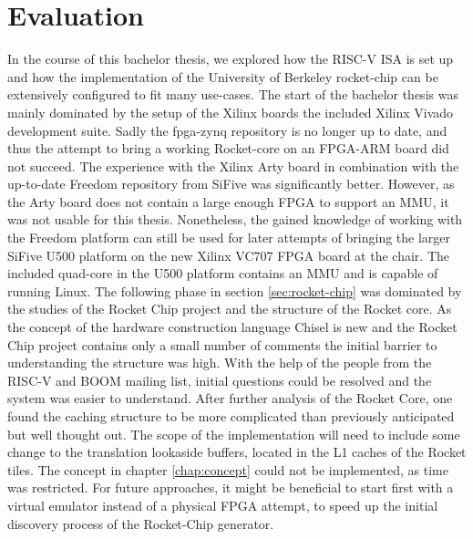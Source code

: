 \chapter{Evaluation}\label{chap:evaluation}
In the course of this bachelor thesis, we explored how the
RISC-V ISA is set up and how the implementation of the
University of Berkeley rocket-chip can be extensively
configured to fit many use-cases.
The start of the bachelor thesis was mainly dominated
by the setup of the Xilinx boards the included Xilinx Vivado
development suite.
Sadly the fpga-zynq repository is no longer up to date, and thus
the attempt to bring a working Rocket-core on an FPGA-ARM board did
not succeed.
The experience with the Xilinx Arty board in combination
with the up-to-date Freedom repository from SiFive was significantly better.
However, as the Arty board does not contain a large enough
FPGA to support an MMU, it was not usable for this thesis.
Nonetheless, the gained knowledge of working with the Freedom
platform can still be used for later attempts of bringing
the larger SiFive U500 platform on the new Xilinx VC707 FPGA board
at the chair. The included quad-core in the U500 platform
contains an MMU and is capable of running Linux.
The following phase in
section \ref{sec:rocket-chip} was dominated by the studies of
the Rocket Chip project and the structure of the Rocket core.
As the concept of the hardware construction language Chisel
is new and the Rocket Chip project contains only a small number
of comments the initial barrier to understanding the structure was high.
With the help of the people from the RISC-V and BOOM mailing list,
initial questions could be resolved and the system was easier to understand.
After further analysis of the Rocket Core, one found the
caching structure to be more complicated than previously
anticipated but well thought out.
The scope of the implementation will need to include some
change to the translation lookaside buffers, located in the
L1 caches of the Rocket tiles.
The concept in chapter \ref{chap:concept} could not be
implemented, as time was restricted.
For future approaches, it might be beneficial to start first
with a virtual emulator instead of a physical FPGA attempt,
to speed up the initial discovery process of the Rocket-Chip
generator.